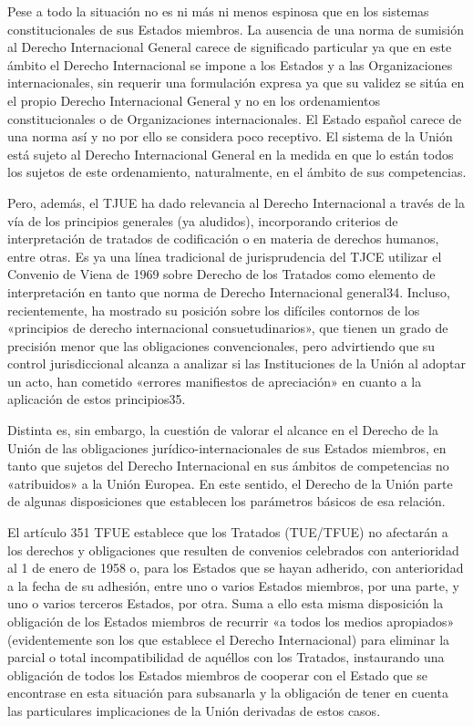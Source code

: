\documentclass[10pt,a4paper]{article}
\begin{document}
Pese a todo la situación no es ni más ni menos espinosa que en los sistemas constitucionales de sus Estados miembros. La ausencia de una norma de sumisión al Derecho Internacional General carece de significado particular ya que en este ámbito el Derecho Internacional se impone a los Estados y a las Organizaciones internacionales, sin requerir una formulación expresa ya que su validez se sitúa en el propio Derecho Internacional General y no en los ordenamientos constitucionales o de Organizaciones internacionales. El Estado español carece de una norma así y no por ello se considera poco receptivo. El sistema de la Unión está sujeto al Derecho Internacional General en la medida en que lo están todos los sujetos de este ordenamiento, naturalmente, en el ámbito de sus competencias.

Pero, además, el TJUE ha dado relevancia al Derecho Internacional a través de la vía de los principios generales (ya aludidos), incorporando criterios de interpretación de tratados de codificación o en materia de derechos humanos, entre otras. Es ya una línea tradicional de jurisprudencia del TJCE utilizar el Convenio de Viena de 1969 sobre Derecho de los Tratados como elemento de interpretación en tanto que norma de Derecho Internacional general34. Incluso, recientemente, ha mostrado su posición sobre los difíciles contornos de los «principios de derecho internacional consuetudinarios», que tienen un grado de precisión menor que las obligaciones convencionales, pero advirtiendo que su control jurisdiccional alcanza a analizar si las Instituciones de la Unión al adoptar un acto, han cometido «errores manifiestos de apreciación» en cuanto a la aplicación de estos principios35. 

Distinta es, sin embargo, la cuestión de valorar el alcance en el Derecho de la Unión de las obligaciones jurídico-internacionales de sus Estados miembros, en tanto que sujetos del Derecho Internacional en sus ámbitos de competencias no «atribuidos» a la Unión Europea. En este sentido, el Derecho de la Unión parte de algunas disposiciones que establecen los parámetros básicos de esa relación.

El artículo 351 TFUE establece que los Tratados (TUE/TFUE) no afectarán a los derechos y obligaciones que resulten de convenios celebrados con anterioridad al 1 de enero de 1958 o, para los Estados que se hayan adherido, con anterioridad a la fecha de su adhesión, entre uno o varios Estados miembros, por una parte, y uno o varios terceros Estados, por otra. Suma a ello esta misma disposición la obligación de los Estados miembros de recurrir «a todos los medios apropiados» (evidentemente son los que establece el Derecho Internacional) para eliminar la parcial o total incompatibilidad de aquéllos con los Tratados, instaurando una obligación de todos los Estados miembros de cooperar con el Estado que se encontrase en esta situación para subsanarla y la obligación de tener en cuenta las particulares implicaciones de la Unión derivadas de estos casos.
\end{document}
